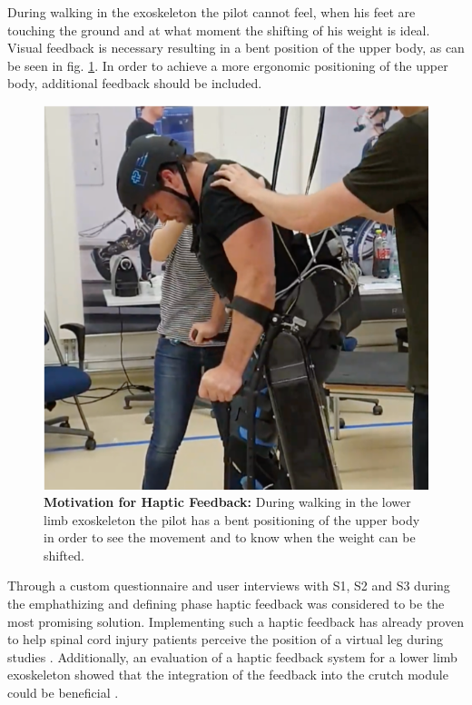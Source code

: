 \documentclass[conference,a4paper]{IEEEtran}
\begin{document}
During walking in the exoskeleton the pilot cannot feel, when his feet are touching the ground and at what moment the shifting of his weight is ideal. Visual feedback is necessary resulting in a bent position of the upper body, as can be seen in fig. \ref{motivation_haptic_feedback}. In order to achieve a more ergonomic positioning of the upper body, additional feedback should be included.
\begin{figure}[!t]
	\centering
	\includegraphics[width=1\columnwidth]{Images/Results/motivation_haptic_feedback.png}
	\caption{\textbf{Motivation for Haptic Feedback:} During walking in the lower limb exoskeleton the pilot has a bent positioning of the upper body in order to see the movement and to know when the weight can be shifted.}
	\label{motivation_haptic_feedback}
\end{figure}
Through a custom questionnaire and user interviews with S1, S2 and S3 during the emphathizing and defining phase haptic feedback was considered to be the most promising solution. Implementing such a haptic feedback has already proven to help spinal cord injury patients perceive the position of a virtual leg during studies \cite{solaimanshokur}. Additionally, an evaluation of a haptic feedback system for a lower limb exoskeleton showed that the integration of the feedback into the crutch module could be beneficial \cite{GerhardKuert}.
\end{document}
